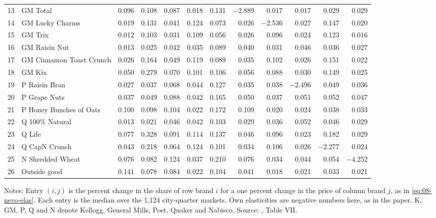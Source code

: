 \begin{table}[htbp]
\begin{tabular}{@{}rlrrrrrrrrrr@{}}
13 & GM Total & 0.096 & 0.108 & 0.087 & 0.018 & 0.131 & $-$2.889 & 0.017 & 0.017 & 0.029 & 0.029 \\
14 & GM Lucky Charms & 0.019 & 0.131 & 0.041 & 0.124 & 0.073 & 0.026 & $-$2.536 & 0.027 & 0.147 & 0.020 \\
15 & GM Trix & 0.012 & 0.103 & 0.031 & 0.109 & 0.056 & 0.026 & 0.096 & 0.024 & 0.123 & 0.016 \\
16 & GM Raisin Nut & 0.013 & 0.025 & 0.042 & 0.035 & 0.089 & 0.040 & 0.031 & 0.046 & 0.036 & 0.027 \\
17 & GM Cinnamon Toast Crunch & 0.026 & 0.164 & 0.049 & 0.119 & 0.089 & 0.035 & 0.102 & 0.026 & 0.151 & 0.022 \\
18 & GM Kix & 0.050 & 0.279 & 0.070 & 0.101 & 0.106 & 0.056 & 0.088 & 0.030 & 0.149 & 0.025 \\
19 & P Raisin Bran & 0.027 & 0.037 & 0.068 & 0.044 & 0.127 & 0.035 & 0.038 & $-$2.496 & 0.049 & 0.036 \\
20 & P Grape Nuts & 0.037 & 0.049 & 0.088 & 0.042 & 0.165 & 0.050 & 0.037 & 0.051 & 0.052 & 0.047 \\
21 & P Honey Bunches of Oats & 0.100 & 0.098 & 0.104 & 0.022 & 0.172 & 0.109 & 0.020 & 0.024 & 0.038 & 0.033 \\
22 & Q 100\% Natural & 0.013 & 0.021 & 0.046 & 0.042 & 0.103 & 0.029 & 0.036 & 0.052 & 0.046 & 0.029 \\
23 & Q Life & 0.077 & 0.328 & 0.091 & 0.114 & 0.137 & 0.046 & 0.096 & 0.023 & 0.182 & 0.029 \\
24 & Q CapN Crunch & 0.043 & 0.218 & 0.064 & 0.124 & 0.101 & 0.034 & 0.106 & 0.026 & $-$2.277 & 0.024 \\
25 & N Shredded Wheat & 0.076 & 0.082 & 0.124 & 0.037 & 0.210 & 0.076 & 0.034 & 0.044 & 0.054 & $-$4.252 \\
26 & Outside good & 0.141 & 0.078 & 0.084 & 0.022 & 0.104 & 0.041 & 0.018 & 0.021 & 0.033 & 0.021 \\
\bottomrule
\end{tabular}

\smallskip
\begin{minipage}{0.97\linewidth}
\footnotesize Notes: Entry $(i, j)$ is the percent change in the share of row brand $i$ for a one percent
change in the price of column brand $j$, as in \cref{eq:08-nevo-elas}. Each entry is the median over the 1,124
city-quarter markets. Own elasticities are negative numbers here, as in the paper. K, GM, P, Q and N denote
Kellogg, General Mills, Post, Quaker and Nabisco. Source: \citet{Nevo2001}, Table VII.
\end{minipage}
\end{table}


